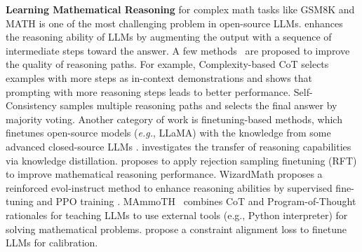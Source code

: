     \textbf{Learning Mathematical Reasoning} for complex math tasks like GSM8K \citep{cobbe2021training} and MATH \citep{hendrycks2021measuring} is one of the most challenging problem in open-source LLMs.
    \citet{wei2022chain} enhances the reasoning ability of LLMs by augmenting the output with a sequence of intermediate steps toward the answer. A few methods~\citep{fu2023complexitybased,wang2023selfconsistency,zhou2023leasttomost} are proposed to improve the quality of reasoning paths. For example, Complexity-based CoT \citep{fu2023complexitybased} selects examples with more steps as in-context demonstrations and shows that prompting with more reasoning steps leads to better performance. Self-Consistency \citep{wang2023selfconsistency} samples multiple reasoning paths and selects the final answer by majority voting. Another category of work is finetuning-based methods, which finetunes open-source models (\emph{e.g.}, LLaMA) with the knowledge from some advanced closed-source LLMs \citep{gpt3-5,gpt4}. 
    \citet{magister2023teaching} investigates the transfer of reasoning capabilities via knowledge distillation. 
    \citet{yuan2023scaling} proposes to apply rejection sampling finetuning (RFT) to improve mathematical reasoning performance. WizardMath \citep{luo2023wizardmath} proposes a reinforced evol-instruct method to enhance reasoning abilities by supervised fine-tuning and PPO training \citep{schulman2017proximal}. MAmmoTH~\citep{yue2023mammoth} combines CoT and Program-of-Thought \citep{chen2022program} rationales for teaching LLMs to use external tools (e.g., Python interpreter) for solving mathematical problems. \citet{wang2023making} propose a constraint alignment loss to finetune LLMs for calibration.

